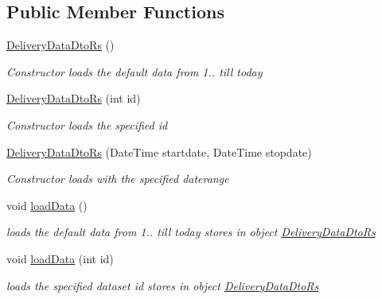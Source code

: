 \subsection*{Public Member Functions}
\begin{DoxyCompactItemize}
\item 
\hyperlink{classkpi_mvc_api_1_1_data_transfer_objects_1_1_delivery_data_dto_rs_a2f5d9488a60c596c15ec91ea71a4df84}{Delivery\+Data\+Dto\+Rs} ()
\begin{DoxyCompactList}\small\item\em Constructor loads the default data from 1.. till today \end{DoxyCompactList}\item 
\hyperlink{classkpi_mvc_api_1_1_data_transfer_objects_1_1_delivery_data_dto_rs_a329d3c877228b17932f852ebb24a2339}{Delivery\+Data\+Dto\+Rs} (int id)
\begin{DoxyCompactList}\small\item\em Constructor loads the specified id \end{DoxyCompactList}\item 
\hyperlink{classkpi_mvc_api_1_1_data_transfer_objects_1_1_delivery_data_dto_rs_ab4a2e25c208fc08d574771e5054f6f96}{Delivery\+Data\+Dto\+Rs} (Date\+Time startdate, Date\+Time stopdate)
\begin{DoxyCompactList}\small\item\em Constructor loads with the specified daterange \end{DoxyCompactList}\item 
void \hyperlink{classkpi_mvc_api_1_1_data_transfer_objects_1_1_delivery_data_dto_rs_a49d6be9988a6157c75746ca357a44813}{load\+Data} ()
\begin{DoxyCompactList}\small\item\em loads the default data from 1.. till today stores in object {\ttfamily \hyperlink{classkpi_mvc_api_1_1_data_transfer_objects_1_1_delivery_data_dto_rs}{Delivery\+Data\+Dto\+Rs}} \end{DoxyCompactList}\item 
void \hyperlink{classkpi_mvc_api_1_1_data_transfer_objects_1_1_delivery_data_dto_rs_a0f32ca8fceecc3a51dadd09b68029df4}{load\+Data} (int id)
\begin{DoxyCompactList}\small\item\em loads the specified dataset id stores in object {\ttfamily \hyperlink{classkpi_mvc_api_1_1_data_transfer_objects_1_1_delivery_data_dto_rs}{Delivery\+Data\+Dto\+Rs}} \end{DoxyCompactList}\item 

\end{DoxyCompactItemize}
